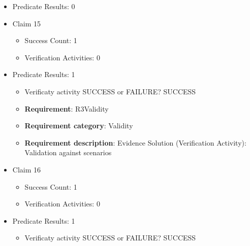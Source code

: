 \documentclass{article}
\begin{document}
\begin{itemize}
\begin{itemize}
					\item Verification activity SUCCESS or FAILURE? SUCCESS
		
						\item \textbf{Requirement}: R2FeatureCalcTTC 
						\item \textbf{Requirement category}: FunctionsCoverage 
						\item \textbf{Requirement description}: Evidence Solution (Verification Activity): Check the features and subsystems covered by the model  To stop the vehicle if TTC is equal to MinTTC
					
				\end{itemize}
				
									    
				\item Predicate Results: 0

  				  \item Claim 15
				\begin{itemize}
			    	\item Success Count: 1 
			    	\item Verification Activities: 0
				\end{itemize}
				
									    
				\item Predicate Results: 1
					\begin{itemize}				
					\item Verificaty activity SUCCESS or FAILURE? SUCCESS
					
					\item \textbf{Requirement}: R3Validity 
					\item \textbf{Requirement category}: Validity
					\item \textbf{Requirement description}: Evidence Solution (Verification Activity): Validation against scenarios
					\end{itemize}

  				  \item Claim 16
				\begin{itemize}
			    	\item Success Count: 1 
			    	\item Verification Activities: 0
				\end{itemize}
				
									    
				\item Predicate Results: 1
					\begin{itemize}				
					\item Verificaty activity SUCCESS or FAILURE? SUCCESS
					

\end{itemize}
\end{itemize}
\end{document}
